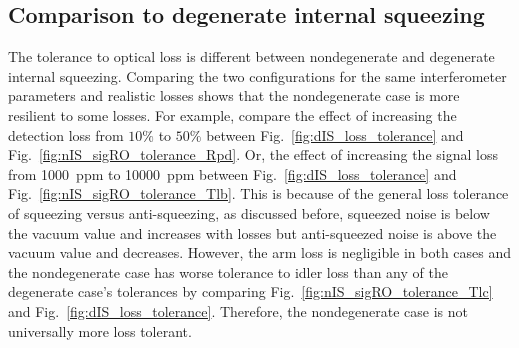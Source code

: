 \subsection{Comparison to degenerate internal squeezing}

The tolerance to optical loss is different between nondegenerate and degenerate internal squeezing. Comparing the two configurations for the same interferometer parameters and realistic losses shows that the nondegenerate case is more resilient to some losses. For example, compare the effect of increasing the detection loss from $10\%$ to $50\%$ between Fig.~\ref{fig:dIS_loss_tolerance} and Fig.~\ref{fig:nIS_sigRO_tolerance_Rpd}. Or, the effect of increasing the signal loss from 1000~ppm to 10000~ppm between Fig.~\ref{fig:dIS_loss_tolerance} and Fig.~\ref{fig:nIS_sigRO_tolerance_Tlb}. 
This is because of the general loss tolerance of squeezing versus anti-squeezing, as discussed before, squeezed noise is below the vacuum value and increases with losses but anti-squeezed noise is above the vacuum value and decreases. %
However, the arm loss is negligible in both cases and the nondegenerate case has worse tolerance to idler loss than any of the degenerate case's tolerances by comparing Fig.~\ref{fig:nIS_sigRO_tolerance_Tlc} and Fig.~\ref{fig:dIS_loss_tolerance}. Therefore, the nondegenerate case is not universally more loss tolerant. %
